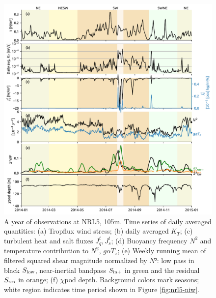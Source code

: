 \documentclass[onecol]{ametsoc}
\begin{document}
\begin{figure}
\centering
\includegraphics[width=\textwidth]{figure6-nrl5.pdf}
\caption{\label{fig:nrl}
A year of observations at NRL5, 105m. Time series of daily averaged quantities: (a) Tropflux wind stress; (b) daily averaged \(K_T\); (c) turbulent heat and salt fluxes \(J_q^t, J_s^t\); (d) Buoyancy frequency \(N^2\) and temperature contribution to \(N^2\), \(g \alpha T_z\); (e) Weekly running mean of filtered squared shear magnitude normalized by $N²$: low pass in black $S_\text{low}$, near-inertial bandpass $S_\text{in+}$ in green and the residual $S_\text{res}$ in orange; (f) \(\chi\)pod depth. Background colors mark seasons; white region indicates time period shown in Figure \ref{fig:nrl5-niw}.}
\end{figure}
\end{document}
